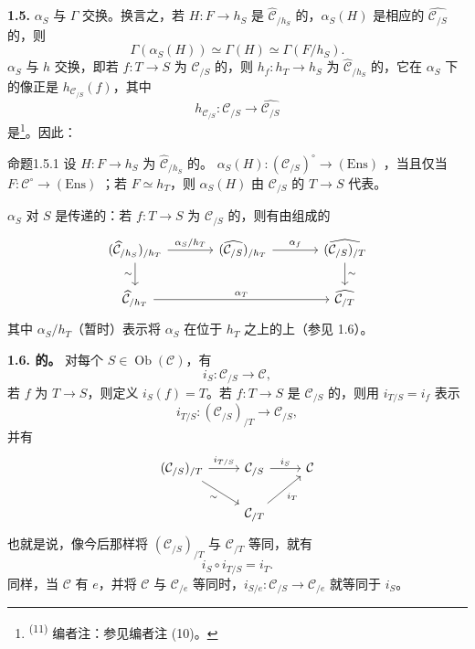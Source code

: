 \textbf{1.5.}  $\alpha_S$ 与 $\Gamma$ 交换。换言之，若 $H:F\to h_S$ 是 $\widehat{\mathcal C}_{/h_S}$ 的，$\alpha_S(H)$ 是相应的 $\widehat{\mathcal C_{/S}}$ 的，则
\[
\Gamma(\alpha_S(H))\simeq\Gamma(H)\simeq\Gamma(F/h_S).
\]
 $\alpha_S$ 与 $h$ 交换，即若 $f:T\to S$ 为 $\mathcal C_{/S}$ 的，则 $h_f:h_T\to h_S$ 为 $\widehat{\mathcal C}_{/h_S}$ 的，它在 $\alpha_S$ 下的像正是 $h_{\mathcal C_{/S}}(f)$，其中
\[
h_{\mathcal C_{/S}}:\mathcal C_{/S}\longrightarrow\widehat{\mathcal C_{/S}}
\]
是\footnote{\textsuperscript{(11)} 编者注：参见编者注 (10)。}。因此：
\begin{SGAresult}{命题}{1.5.1}
设 $H:F\to h_S$ 为 $\widehat{\mathcal C}_{/h_S}$ 的。 $\alpha_S(H):(\mathcal C_{/S})^\circ\to(\mathrm{Ens})$ ，当且仅当 $F:\mathcal C^\circ\to(\mathrm{Ens})$ ；若 $F\simeq h_T$，则 $\alpha_S(H)$ 由 $\mathcal C_{/S}$ 的 $T\to S$ 代表。
\end{SGAresult}
 $\alpha_S$ 对 $S$ 是传递的：若 $f:T\to S$ 为 $\mathcal C_{/S}$ 的，则有由组成的
\[
\begin{tikzcd}[column sep=large]
(\widehat{\mathcal C}_{/h_S})_{/h_T}
 \arrow[r,"\alpha_S/h_T"]\arrow[d,"\sim"']&
(\widehat{\mathcal C_{/S}})_{/h_T}\arrow[r,"\alpha_f"]&
\widehat{(\mathcal C_{/S})_{/T}}\arrow[d,"\sim"]\\
\widehat{\mathcal C}_{/h_T}\arrow[rr,"\alpha_T"]&&\widehat{\mathcal C_{/T}}
\end{tikzcd}
\]
其中 $\alpha_S/h_T$（暂时）表示将 $\alpha_S$ 在位于 $h_T$ 之上的上（参见 1.6）。

\textbf{1.6. 的。} 对每个 $S\in\operatorname{Ob}(\mathcal C)$，有
\[
i_S:\mathcal C_{/S}\longrightarrow\mathcal C,
\]
若 $f$ 为 $T\to S$，则定义 $i_S(f)=T$。若 $f:T\to S$ 是 $\mathcal C_{/S}$ 的，则用 $i_{T/S}=i_f$ 表示
\[
i_{T/S}:(\mathcal C_{/S})_{/T}\longrightarrow\mathcal C_{/S},
\]
并有
\[
\begin{tikzcd}
(\mathcal C_{/S})_{/T}\arrow[r,"i_{T/S}"]\arrow[dr,"\sim"']&\mathcal C_{/S}\arrow[r,"i_S"]&\mathcal C\\
&\mathcal C_{/T}\arrow[ur,"i_T"']&
\end{tikzcd}
\]
也就是说，像今后那样将 $(\mathcal C_{/S})_{/T}$ 与 $\mathcal C_{/T}$ 等同，就有
\[
i_S\circ i_{T/S}=i_T.
\]
同样，当 $\mathcal C$ 有 $e$，并将 $\mathcal C$ 与 $\mathcal C_{/e}$ 等同时，$i_{S/e}:\mathcal C_{/S}\to\mathcal C_{/e}$ 就等同于 $i_S$。


